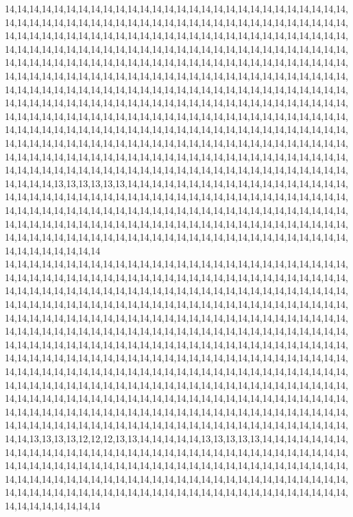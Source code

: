 14,14,14,14,14,14,14,14,14,14,14,14,14,14,14,14,14,14,14,14,14,14,14,14,14,14,14,14,14,14,14,14,14,14,14,14,14,14,14,14,14,14,14,14,14,14,14,14,14,14,14,14,14,14,14,14,14,14,14,14,14,14,14,14,14,14,14,14,14,14,14,14,14,14,14,14,14,14,14,14,14,14,14,14,14,14,14,14,14,14,14,14,14,14,14,14,14,14,14,14,14,14,14,14,14,14,14,14,14,14,14,14,14,14,14,14,14,14,14,14,14,14,14,14,14,14,14,14,14,14,14,14,14,14,14,14,14,14,14,14,14,14,14,14,14,14,14,14,14,14,14,14,14,14,14,14,14,14,14,14,14,14,14,14,14,14,14,14,14,14,14,14,14,14,14,14,14,14,14,14,14,14,14,14,14,14,14,14,14,14,14,14,14,14,14,14,14,14,14,14,14,14,14,14,14,14,14,14,14,14,14,14,14,14,14,14,14,14,14,14,14,14,14,14,14,14,14,14,14,14,14,14,14,14,14,14,14,14,14,14,14,14,14,14,14,14,14,14,14,14,14,14,14,14,14,14,14,14,14,14,14,14,14,14,14,14,14,14,14,14,14,14,14,14,14,14,14,14,14,14,14,14,14,14,14,14,14,14,14,14,14,14,14,14,14,14,14,14,14,14,14,14,14,14,14,14,14,14,14,14,14,14,14,14,14,14,14,14,14,14,14,14,14,14,14,14,14,14,14,14,14,14,14,14,14,14,14,14,14,14,14,14,14,14,14,14,14,14,14,14,14,14,14,14,14,14,14,14,14,14,14,14,14,14,14,14,14,14,13,13,13,13,13,13,14,14,14,14,14,14,14,14,14,14,14,14,14,14,14,14,14,14,14,14,14,14,14,14,14,14,14,14,14,14,14,14,14,14,14,14,14,14,14,14,14,14,14,14,14,14,14,14,14,14,14,14,14,14,14,14,14,14,14,14,14,14,14,14,14,14,14,14,14,14,14,14,14,14,14,14,14,14,14,14,14,14,14,14,14,14,14,14,14,14,14,14,14,14,14,14,14,14,14,14,14,14,14,14,14,14,14,14,14,14,14,14,14,14,14,14,14,14,14,14,14,14,14,14,14,14,14,14,14,14,14,14,14,14,14,14,14,14
14,14,14,14,14,14,14,14,14,14,14,14,14,14,14,14,14,14,14,14,14,14,14,14,14,14,14,14,14,14,14,14,14,14,14,14,14,14,14,14,14,14,14,14,14,14,14,14,14,14,14,14,14,14,14,14,14,14,14,14,14,14,14,14,14,14,14,14,14,14,14,14,14,14,14,14,14,14,14,14,14,14,14,14,14,14,14,14,14,14,14,14,14,14,14,14,14,14,14,14,14,14,14,14,14,14,14,14,14,14,14,14,14,14,14,14,14,14,14,14,14,14,14,14,14,14,14,14,14,14,14,14,14,14,14,14,14,14,14,14,14,14,14,14,14,14,14,14,14,14,14,14,14,14,14,14,14,14,14,14,14,14,14,14,14,14,14,14,14,14,14,14,14,14,14,14,14,14,14,14,14,14,14,14,14,14,14,14,14,14,14,14,14,14,14,14,14,14,14,14,14,14,14,14,14,14,14,14,14,14,14,14,14,14,14,14,14,14,14,14,14,14,14,14,14,14,14,14,14,14,14,14,14,14,14,14,14,14,14,14,14,14,14,14,14,14,14,14,14,14,14,14,14,14,14,14,14,14,14,14,14,14,14,14,14,14,14,14,14,14,14,14,14,14,14,14,14,14,14,14,14,14,14,14,14,14,14,14,14,14,14,14,14,14,14,14,14,14,14,14,14,14,14,14,14,14,14,14,14,14,14,14,14,14,14,14,14,14,14,14,14,14,14,14,14,14,14,14,14,14,14,14,14,14,14,14,14,14,14,14,14,14,14,14,14,14,14,14,14,14,14,14,14,14,14,14,14,14,14,14,14,14,14,14,14,14,13,13,13,13,12,12,12,13,13,14,14,14,14,14,13,13,13,13,13,14,14,14,14,14,14,14,14,14,14,14,14,14,14,14,14,14,14,14,14,14,14,14,14,14,14,14,14,14,14,14,14,14,14,14,14,14,14,14,14,14,14,14,14,14,14,14,14,14,14,14,14,14,14,14,14,14,14,14,14,14,14,14,14,14,14,14,14,14,14,14,14,14,14,14,14,14,14,14,14,14,14,14,14,14,14,14,14,14,14,14,14,14,14,14,14,14,14,14,14,14,14,14,14,14,14,14,14,14,14,14,14,14,14,14,14,14,14,14,14,14,14,14,14,14,14,14
